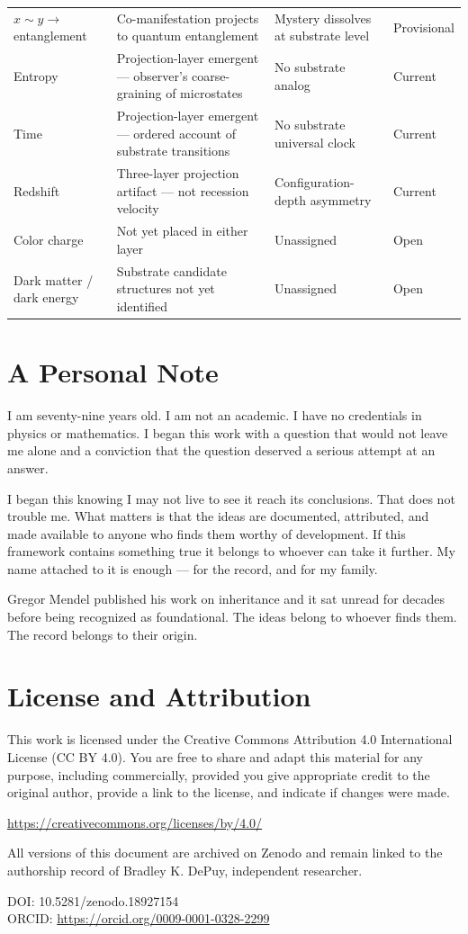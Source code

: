 \documentclass[11pt,letterpaper]{article}
\begin{document}
\begin{table}[htbp]
\begin{tabular}{llp{4.5cm}l}
\(x \sim y \to\) entanglement & Co-manifestation projects to quantum entanglement & Mystery dissolves at substrate level & Provisional\\
Entropy & Projection-layer emergent --- observer's coarse-graining of microstates & No substrate analog & Current\\
Time & Projection-layer emergent --- ordered account of substrate transitions & No substrate universal clock & Current\\
Redshift & Three-layer projection artifact --- not recession velocity & Configuration-depth asymmetry & Current\\
Color charge & Not yet placed in either layer & Unassigned & Open\\
Dark matter / dark energy & Substrate candidate structures not yet identified & Unassigned & Open\\
\bottomrule
\end{tabular}
\end{table}
\section{A Personal Note}
\label{sec:org598caae}

I am seventy-nine years old. I am not an academic. I have no credentials in physics or mathematics. I began this work with a question that would not leave me alone and a conviction that the question deserved a serious attempt at an answer.

I began this knowing I may not live to see it reach its conclusions. That does not trouble me. What matters is that the ideas are documented, attributed, and made available to anyone who finds them worthy of development. If this framework contains something true it belongs to whoever can take it further. My name attached to it is enough --- for the record, and for my family.

Gregor Mendel published his work on inheritance and it sat unread for decades before being recognized as foundational. The ideas belong to whoever finds them. The record belongs to their origin.
\section{License and Attribution}
\label{sec:org9b79aa9}

This work is licensed under the Creative Commons Attribution 4.0 International License (CC BY 4.0). You are free to share and adapt this material for any purpose, including commercially, provided you give appropriate credit to the original author, provide a link to the license, and indicate if changes were made.

\url{https://creativecommons.org/licenses/by/4.0/}

All versions of this document are archived on Zenodo and remain linked to the authorship record of Bradley K. DePuy, independent researcher.

DOI: 10.5281/zenodo.18927154\\
ORCID: \url{https://orcid.org/0009-0001-0328-2299}
\end{document}
